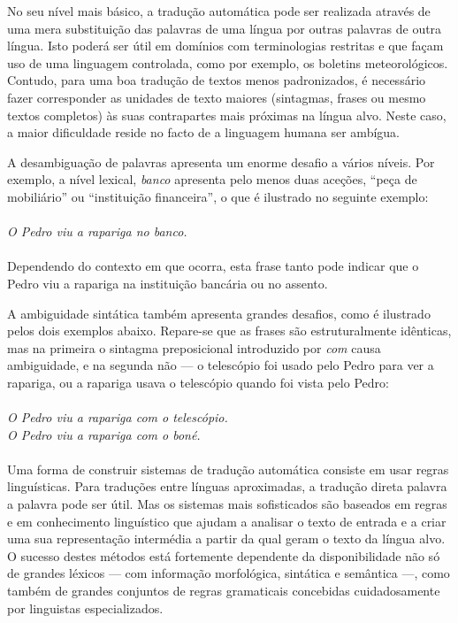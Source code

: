 \begin{multicols}{2}
No seu nível mais básico, a tradução automática pode ser realizada através de uma mera substituição das palavras de uma língua por outras palavras de outra língua. 
Isto poderá ser útil em domínios com terminologias restritas e que façam uso de uma linguagem controlada, como por exemplo, os boletins meteorológicos. 
Contudo, para uma boa tradução de textos menos padronizados, é necessário fazer corresponder as unidades de texto maiores (sintagmas, frases ou mesmo textos completos) às suas contrapartes mais próximas na língua alvo. 
Neste caso, a maior dificuldade reside no facto de a linguagem humana ser ambígua. 

A desambiguação de palavras apresenta um enorme desafio a vários níveis. 
Por exemplo, a nível lexical, \textit{banco} apresenta pelo menos duas aceções, “peça de mobiliário” ou 
“instituição financeira”, o que é ilustrado no seguinte exemplo:\\
\\
\textit{O Pedro viu a rapariga no banco.} \\
\\
Dependendo do contexto em que ocorra, esta frase tanto pode indicar que o Pedro viu a rapariga
na instituição bancária ou no assento.

A ambiguidade sintática também apresenta grandes desafios, como é ilustrado pelos dois exemplos abaixo. 
Repare-se que as frases são estruturalmente idênticas, mas na primeira o sintagma
preposicional introduzido por \textit{com} causa ambiguidade, e na segunda não --- o telescópio
foi usado pelo Pedro para ver a rapariga, ou a rapariga usava o telescópio quando foi vista
pelo Pedro:\\
\\
\textit{O Pedro viu a rapariga com o telescópio.}\\
\textit{O Pedro viu a rapariga com o boné.}\\
\\
Uma forma de construir sistemas de tradução automática consiste em usar regras linguísticas.
Para traduções entre línguas aproximadas, a tradução direta palavra a palavra pode ser útil. 
Mas os sistemas mais sofisticados são baseados em regras e em conhecimento linguístico
que ajudam a analisar o texto de entrada e a criar uma sua representação intermédia a partir da qual geram o texto da língua alvo. 
O sucesso destes métodos está fortemente dependente da disponibilidade não só de grandes lé\-xi\-cos ---
com informação morfológica, sintática e semântica ---, como também de grandes conjuntos de regras gramaticais 
concebidas cuidadosamente por linguistas especializados.


\end{multicols}
